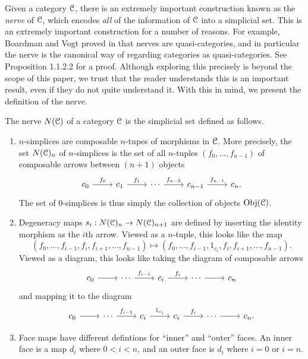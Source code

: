 Given a category $\mathcal{C}$, there is an extremely important construction known as the \emph{nerve} of $\mathcal{C}$, which encodes \emph{all} of the information of $\mathcal{C}$ into a simplicial set. This is an extremely important construction for a number of reasons. For example, Boardman and Vogt proved in \cite{BV73} that nerves are quasi-categories, and in particular the nerve is the canonical way of regarding categories as quasi-categories. See \cite{htt} Proposition 1.1.2.2 for a proof. Although exploring this precisely is beyond the scope of this paper, we trust that the reader understands this is an important result, even if they do not quite understand it. With this in mind, we present the definition of the nerve.

\begin{definition}\label{3.3.1}
    The nerve $N(\mathcal{C})$ of a category $\mathcal{C}$ is the simplicial set defined as follows.
    \begin{enumerate}
        \item $n$-simplices are composable $n$-tupes of morphisms in $\mathcal{C}$. More precisely, the set $N(\mathcal{C})_n$ of $n$-simplices is the set of all $n$-tuples $(f_0,\ldots,f_{n-1})$ of composable arrows between $(n+1)$ objects
        \[\begin{tikzcd}
            c_0 \ar["f_0",r] & c_1 \ar["f_1",r] & \cdots \ar["f_{n-2}", r] & c_{n-1} \ar["f_{n-1}", r] & c_n.
        \end{tikzcd}\]
        The set of $0$-simplices is thus simply the collection of objects $\operatorname{Obj}(\mathcal{C} ) $.
        \item Degeneracy maps $s_i : N(\mathcal{C})_n \to N(\mathcal{C})_{n+1}$ are defined by inserting the identity morphism as the $i$th arrow. Viewed as a $n$-tuple, this looks like the map
        \[
        (f_0,\ldots,f_{i-1},f_i,f_{i+1},\ldots,f_{n-1}) \mapsto (f_0,\ldots,f_{i-1},1_{c_i},f_i,f_{i+1},\ldots,f_{n-1}).
        \]
        Viewed as a diagram, this looks like taking the diagram of composable arrows
        \[\begin{tikzcd}
            c_0 \ar[r] & \cdots \ar["f_{i-1}", r] & c_{i} \ar["f_i",r] & \cdots \ar[r] & c_n
        \end{tikzcd}\]
        and mapping it to the diagram
        \[\begin{tikzcd}
            c_0 \ar[r] & \cdots \ar["f_{i-1}", r] & c_{i} \ar["1_{c_i}", r] & c_i \ar["f_i",r] & \cdots \ar[r] & c_n.
        \end{tikzcd}\]
        \item Face maps have different defintions for ``inner'' and ``outer'' faces. An inner face is a map $d_i$ where $0<i<n$, and an outer face is $d_i$ where $i=0$ or $i=n$.

\end{enumerate}
\end{definition}
